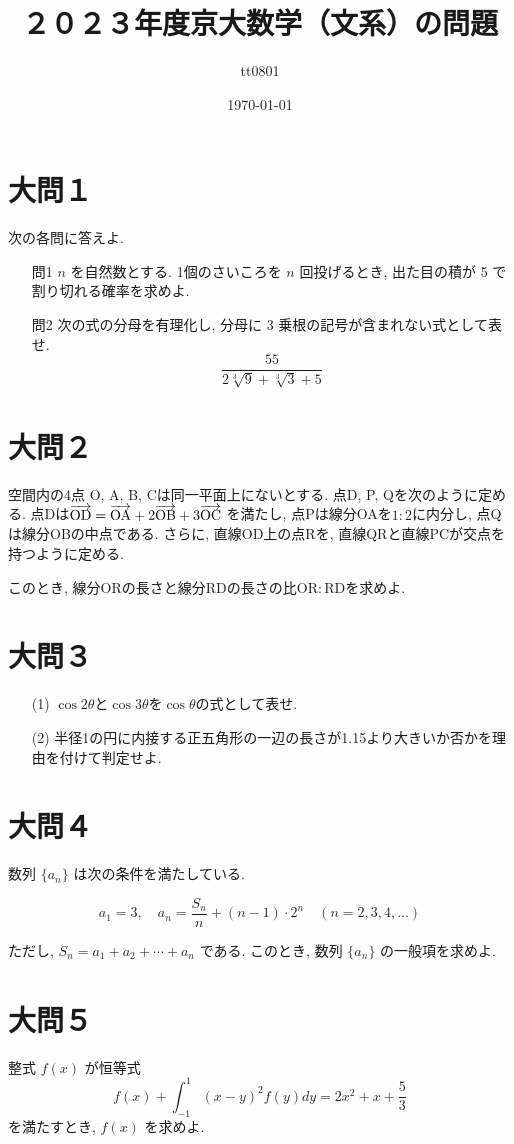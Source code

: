 \documentclass[dvipdfmx,a4paper]{jsarticle}
\title{２０２３年度京大数学（文系）の問題}
\author{tt0801}
\date{\today}
\begin{document}
    \maketitle
    \section{大問１}
    次の各問に答えよ. 

    \begin{itemize}
        \item [問1] \quad $n$ を自然数とする. 1個のさいころを $n$ 回投げるとき, 出た目の積が 5 で割り切れる確率を求めよ. 
        \item [問2] \quad 次の式の分母を有理化し, 分母に 3 乗根の記号が含まれない式として表せ. 
            \[
                \frac{55}{2 \sqrt[3]{9} + \sqrt[3]{3} + 5}
            \]
    \end{itemize}

    
    \section{大問２}
    空間内の4点 O, A, B, Cは同一平面上にないとする. 点D, P, Qを次のように定める. 
    点Dは$\overrightarrow{\mathrm{OD}} = \overrightarrow{\mathrm{OA}} + 2\overrightarrow{\mathrm{OB}} + 3\overrightarrow{\mathrm{OC}}$ を満たし,   
    点Pは線分OAを$1 : 2$に内分し, 点Qは線分OBの中点である. さらに,   
    直線OD上の点Rを, 直線QRと直線PCが交点を持つように定める.   

    このとき, 線分ORの長さと線分RDの長さの比$\mathrm{OR} : \mathrm{RD}$を求めよ. 

    \section{大問３}
    \begin{itemize}
        \item [(1)] $\cos 2\theta$と$\cos 3\theta$を$\cos \theta$の式として表せ. 
        \item [(2)] 半径1の円に内接する正五角形の一辺の長さが1.15より大きいか否かを理由を付けて判定せよ. 
    \end{itemize}


    \section{大問４}
    数列 $\{a_n\}$ は次の条件を満たしている. 

    \[
    a_1 = 3, \quad a_n = \frac{S_n}{n} + (n-1) \cdot 2^n \quad (n = 2, 3, 4, \ldots)
    \]

    ただし, $S_n = a_1 + a_2 + \cdots + a_n$ である. このとき, 数列 $\{a_n\}$ の一般項を求めよ. 

    \section{大問５}
    整式 $f(x)$ が恒等式
    \begin{equation*}
        f(x) + \int_{-1}^1 (x-y)^2 f(y) dy = 2x^2 + x + \frac{5}{3}
    \end{equation*}
    を満たすとき, $f(x)$ を求めよ. 
\end{document}
